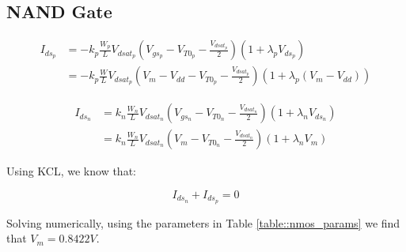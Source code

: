 \documentclass[fleqn]{article}
\begin{document}
	\subsection{NAND Gate}

	\begin{align}
		I_{ds_p} &= -k_p\frac{W_p}{L}V_{dsat_p}\left(V_{gs_p} - V_{T0_p} - \frac{V_{dsat_p}}{2}\right)\left(1 + {\lambda_p}V_{ds_p}\right) \\
		&= -k_p\frac{W}{L}V_{dsat_p}\left(V_m - V_{dd} - V_{T0_p} - \frac{V_{dsat_p}}{2}\right)\left(1 + {\lambda_p}(V_m - V_{dd})\right)
	\end{align}
	
	\begin{align}
		I_{ds_n} &= k_n\frac{W_n}{L}V_{dsat_n}\left(V_{gs_n} - V_{T0_n} - \frac{V_{dsat_n}}{2}\right)\left(1 + {\lambda_n}V_{ds_n}\right) \\
		&= k_n\frac{W_n}{L}V_{dsat_n}\left(V_m - V_{T0_n} - \frac{V_{dsat_n}}{2}\right)\left(1 + {\lambda_n}V_m\right)
	\end{align}
	
	Using KCL, we know that:
	
	\begin{equation}
		I_{ds_n} + I_{ds_p} = 0
	\end{equation}
	
	Solving numerically, using the parameters in Table \ref{table::nmos_params} we find that $V_m = 0.8422 V$.
	
	
\end{document}
